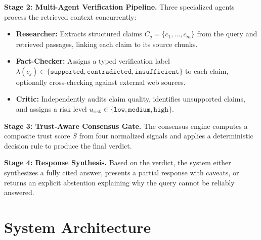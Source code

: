 \documentclass[conference]{IEEEtran}
\begin{document}
\textbf{Stage 2: Multi-Agent Verification Pipeline.}
Three specialized agents process the retrieved context concurrently:
\begin{itemize}
  \item \textbf{Researcher:} Extracts structured claims $C_q = \{c_1, \ldots, c_m\}$
    from the query and retrieved passages, linking each claim to its source chunks.
  \item \textbf{Fact-Checker:} Assigns a typed verification label
    $\lambda(c_j) \in \{\texttt{supported}, \texttt{contradicted}, \texttt{insufficient}\}$
    to each claim, optionally cross-checking against external web sources.
  \item \textbf{Critic:} Independently audits claim quality, identifies unsupported
    claims, and assigns a risk level $u_{\text{risk}} \in \{\texttt{low}, \texttt{medium}, \texttt{high}\}$.
\end{itemize}

\textbf{Stage 3: Trust-Aware Consensus Gate.}
The consensus engine computes a composite trust score $S$ from four normalized
signals and applies a deterministic decision rule to produce the final verdict.

\textbf{Stage 4: Response Synthesis.}
Based on the verdict, the system either synthesizes a fully cited answer,
presents a partial response with caveats, or returns an explicit abstention
explaining why the query cannot be reliably answered.

\section{System Architecture}
\label{sec:system}
\end{document}
